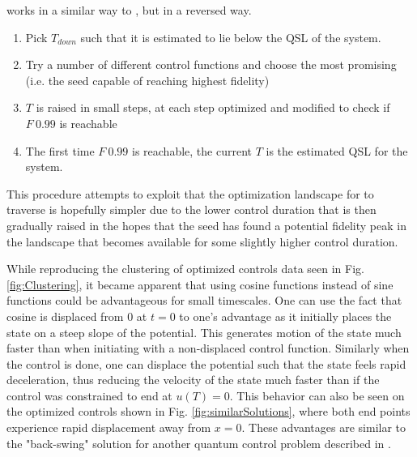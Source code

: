 \documentclass[a4paper, twocolumn]{revtex4-1}
\begin{document}
 works in a similar way to , but in a reversed way.
\begin{enumerate}
	\item Pick $T_{down}$ such that it is estimated to lie below the QSL of the system.
	\item Try a number of different control functions and choose the most promising (i.e. the seed capable of reaching highest fidelity)
	\item $T$ is raised in small steps, at each step optimized and modified to check if $F~0.99$ is reachable
	\item The first time $F~0.99$ is reachable, the current $T$ is the estimated QSL for the system.
\end{enumerate}
This procedure attempts to exploit that the optimization landscape for  to traverse is hopefully simpler due to the lower control duration that is then gradually raised in the hopes that the seed has found a potential fidelity peak in the landscape that becomes available for some slightly higher control duration.

While reproducing the clustering of optimized controls data seen in Fig. \ref{fig:Clustering}, it became apparent that using cosine functions instead of sine functions could be advantageous for small timescales. One can use the fact that cosine is displaced from 0 at $t=0$ to one's advantage as it initially places the state on a steep slope of the potential. This generates motion of the state much faster than when initiating with a non-displaced control function. Similarly when the control is done, one can displace the potential such that the state feels rapid deceleration, thus reducing the velocity of the state much faster than if the control was constrained to end at $u(T)=0$. This behavior can also be seen on the optimized controls shown in Fig. \ref{fig:similarSolutions}, where both end points experience rapid displacement away from $x=0$. These advantages are similar to the "back-swing" solution for another quantum control problem described in \cite{QM2Paper}.
\end{document}
